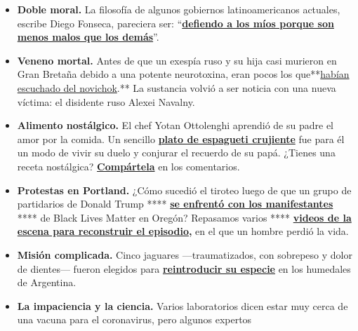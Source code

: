 \begin{itemize}
\item
  \textbf{Doble moral.} La filosofía de algunos gobiernos
  latinoamericanos actuales, escribe Diego Fonseca, pareciera ser:
  ``\textbf{\href{https://www.nytimes3xbfgragh.onion/es/2020/09/03/espanol/opinion/amlo-corrupcion.html}{defiendo
  a los míos porque son menos malos que los demás}}''.
\item
  \textbf{Veneno mortal.} Antes de que un exespía ruso y su hija casi
  murieron en Gran Bretaña debido a una potente neurotoxina, eran pocos
  los
  que**\href{https://www.nytimes3xbfgragh.onion/es/2020/09/02/espanol/mundo/novichok-que-es.html}{habían
  escuchado del novichok}.** La sustancia volvió a ser noticia con una
  nueva víctima: el disidente ruso Alexei Navalny.
\item
  \textbf{Alimento nostálgico.} El chef Yotan Ottolenghi aprendió de su
  padre el amor por la comida. Un sencillo
  \textbf{\href{https://www.nytimes3xbfgragh.onion/es/2020/09/03/espanol/estilos-de-vida/fideos-crocantes-un-platillo-que-me-recuerda-a-papa.html}{plato
  de espagueti crujiente}} fue para él un modo de vivir su duelo y
  conjurar el recuerdo de su papá. ¿Tienes una receta nostálgica?
  \textbf{\href{https://www.nytimes3xbfgragh.onion/es/2020/09/03/espanol/estilos-de-vida/fideos-crocantes-un-platillo-que-me-recuerda-a-papa.html\#commentsContainer}{Compártela}}
  en los comentarios.
\item
  \textbf{Protestas en Portland.} ¿Cómo sucedió el tiroteo luego de que
  un grupo de partidarios de Donald Trump ****
  \textbf{\href{https://www.nytimes3xbfgragh.onion/es/2020/09/02/espanol/estados-unidos/protestas-portland-video.html}{se
  enfrentó con los manifestantes}} **** de Black Lives Matter en Oregón?
  Repasamos varios ****
  \textbf{\href{https://www.nytimes3xbfgragh.onion/es/2020/09/02/espanol/estados-unidos/protestas-portland-video.html}{videos
  de la escena para reconstruir el episodio},} en el que un hombre
  perdió la vida.
\item
  \textbf{Misión complicada.} Cinco jaguares ---traumatizados, con
  sobrepeso y dolor de dientes--- fueron elegidos para
  \textbf{\href{https://www.nytimes3xbfgragh.onion/es/2020/09/01/espanol/america-latina/ibera-conservacion-jaguares-argentina.html}{reintroducir
  su especie}} en los humedales de Argentina.
\item
  \textbf{La impaciencia y la ciencia.} Varios laboratorios dicen estar
  muy cerca de una vacuna para el coronavirus, pero algunos expertos

\end{itemize}
